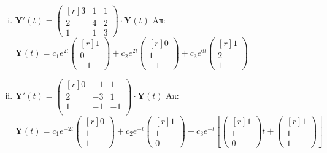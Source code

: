 \begin{enumerate}
\begin{enumerate}[i)]
      \item $ \mathbf{Y}'(t) = 
        \begin{pmatrix*}[r]
          3 & 1 & 1 \\
          2 & 4 & 2 \\
          1 & 1 & 3
        \end{pmatrix*} \cdot 
        \mathbf{Y}(t)$
        \hfill Απ: {\scriptsize $ \mathbf{Y}(t)=c_{1}e^{2t} 
          \begin{pmatrix*}[r] 1 \\ 0 \\ -1 \end{pmatrix*} + c_{2}e^{2t} 
          \begin{pmatrix*}[r] 0 \\ 1 \\ -1 \end{pmatrix*} + c_{3}e^{6t} 
        \begin{pmatrix*}[r] 1 \\ 2 \\ 1 \end{pmatrix*}$ }

      \item $ \mathbf{Y}'(t) = 
        \begin{pmatrix*}[r]
          0 & -1 & 1 \\
          2 & -3 & 1 \\
          1 & -1 & -1 \\
        \end{pmatrix*} \cdot 
        \mathbf{Y}(t) $
        \hfill Απ: {\scriptsize $ \mathbf{Y}(t) =  c_{1}e^{-2t} 
          \begin{pmatrix*}[r] 0 \\ 1 \\ 1 \end{pmatrix*} + c_{2}e^{-t} 
          \begin{pmatrix*}[r] 1 \\ 1 \\ 0  \end{pmatrix*} + c_{3} e^{-t} \left[ 
            \begin{pmatrix*}[r] 1 \\ 1 \\ 0 \end{pmatrix*}t +  
        \begin{pmatrix*}[r] 1 \\ 1 \\ 1 \end{pmatrix*}\right] $}


\end{enumerate}
\end{enumerate}
